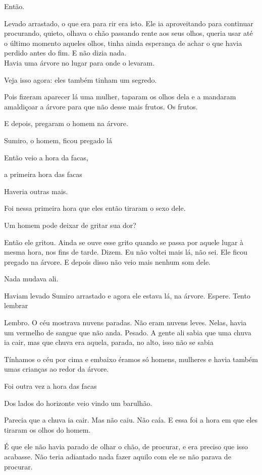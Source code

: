 Então.

Levado arrastado, o que era para rir era isto. Ele ia aproveitando para
continuar procurando, quieto, olhava o chão passando rente aos seus
olhos, queria usar até o último momento aqueles olhos, tinha ainda
esperança de achar o que havia perdido antes do fim. E não dizia nada.\\

Havia uma árvore no lugar para onde o levaram.

Veja isso agora: eles também tinham um segredo.

Pois fizeram aparecer lá uma mulher, taparam os olhos dela e a mandaram
amaldiçoar a árvore para que não desse mais frutos. Os frutos.

E depois, pregaram o homem na árvore.

Sumiro, o homem, ficou pregado lá

Então veio a hora da facas,

a primeira hora das facas

Haveria outras mais.

Foi nessa primeira hora que eles então tiraram o sexo dele.

Um homem pode deixar de gritar sua dor?

Então ele gritou. Ainda se ouve esse grito quando se passa por aquele
lugar à mesma hora, nos fins de tarde. Dizem. Eu não voltei mais lá, não
sei. Ele ficou pregado na árvore. E depois disso não veio mais nenhum
som dele.

Nada mudava ali.

Haviam levado Sumiro arrastado e agora ele estava lá, na árvore. Espere.
Tento lembrar

Lembro. O céu mostrava nuvens paradas. Não eram nuvens leves. Nelas,
havia um vermelho de sangue que não anda. Pesado. A gente ali sabia que
uma chuva ia cair, mas que chuva era aquela, parada, no alto, isso não
se sabia

Tínhamos o céu por cima e embaixo éramos só homens, mulheres e havia
também umas crianças ao redor da árvore.

Foi outra vez a hora das facas

Dos lados do horizonte veio vindo um barulhão.

Parecia que a chuva ia cair. Mas não caiu. Não caía. E essa foi a hora
em que eles tiraram os olhos do homem.

É que ele não havia parado de olhar o chão, de procurar, e era preciso
que isso acabasse. Não teria adiantado nada fazer aquilo com ele se não
parava de procurar.

